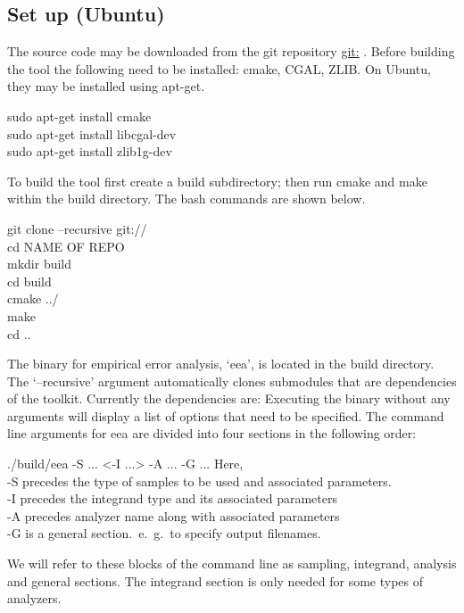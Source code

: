 \subsection{Set up (Ubuntu)}
The source code may be downloaded from the git repository \url{git:} . Before building the tool the following need
to be installed: cmake, CGAL, ZLIB. On Ubuntu, they may be installed using apt-get. 
\begin{tcolorbox}
 sudo apt-get install cmake \\
 sudo apt-get install libcgal-dev \\
 sudo apt-get install zlib1g-dev 
\end{tcolorbox}
 To build the tool first create a build subdirectory; then run cmake and make within the build directory. The bash commands are shown below. 
\begin{tcolorbox}
  git clone --recursive  git:// \\
  cd NAME OF REPO\\
  mkdir build\\
  cd build\\
  cmake ../ \\
  make\\
  cd ..
\end{tcolorbox}
The binary for empirical error analysis, `eea', is located in the build directory. The `--recursive' argument automatically clones submodules that are dependencies of the toolkit. Currently the dependencies are:  Executing the binary without any arguments will display a list of options that need to be specified. The command line arguments for eea are divided into four sections in the following order:
\begin{tcolorbox}
 ./build/eea -S  ... <-I ...> -A ... -G ...
\tcblower
Here, \\
-S precedes the type of samples to be used and associated parameters. \\
-I precedes the integrand type and its associated parameters \\
-A precedes analyzer name along with associated parameters \\
-G is a general section.~e.~g.~to specify output filenames.
\end{tcolorbox}
 We will refer to these blocks of the command line as sampling, integrand, analysis and general sections. The integrand section is only needed for some types of analyzers.
 
